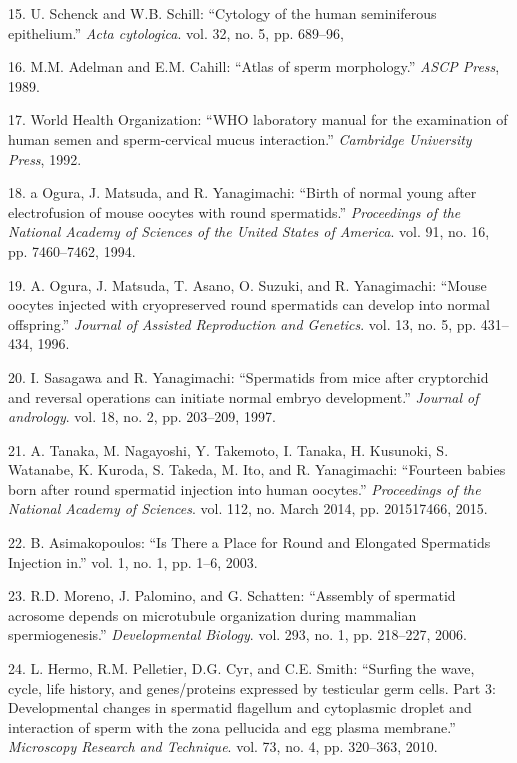 \documentclass[12pt,a4paper,twoside]{ugathesis}
\theoremstyle{definition}
\theoremstyle{definition}
\theoremstyle{definition}
\theoremstyle{remark}
\begin{document}
\hypertarget{ref-Schenck}{}
15. U. Schenck and W.B. Schill: ``Cytology of the human seminiferous
epithelium.'' \emph{Acta cytologica}. vol. 32, no. 5, pp. 689--96,

\hypertarget{ref-Adelman1989}{}
16. M.M. Adelman and E.M. Cahill: ``Atlas of sperm morphology.''
\emph{ASCP Press}, 1989.

\hypertarget{ref-WorldHealthOrganization1992}{}
17. World Health Organization: ``WHO laboratory manual for the
examination of human semen and sperm-cervical mucus interaction.''
\emph{Cambridge University Press}, 1992.

\hypertarget{ref-Ogura1994}{}
18. a Ogura, J. Matsuda, and R. Yanagimachi: ``Birth of normal young
after electrofusion of mouse oocytes with round spermatids.''
\emph{Proceedings of the National Academy of Sciences of the United
States of America}. vol. 91, no. 16, pp. 7460--7462, 1994.

\hypertarget{ref-Kimura1995}{}
19. A. Ogura, J. Matsuda, T. Asano, O. Suzuki, and R. Yanagimachi:
``Mouse oocytes injected with cryopreserved round spermatids can develop
into normal offspring.'' \emph{Journal of Assisted Reproduction and
Genetics}. vol. 13, no. 5, pp. 431--434, 1996.

\hypertarget{ref-Sasagawa}{}
20. I. Sasagawa and R. Yanagimachi: ``Spermatids from mice after
cryptorchid and reversal operations can initiate normal embryo
development.'' \emph{Journal of andrology}. vol. 18, no. 2, pp.
203--209, 1997.

\hypertarget{ref-Tanaka2015}{}
21. A. Tanaka, M. Nagayoshi, Y. Takemoto, I. Tanaka, H. Kusunoki, S.
Watanabe, K. Kuroda, S. Takeda, M. Ito, and R. Yanagimachi: ``Fourteen
babies born after round spermatid injection into human oocytes.''
\emph{Proceedings of the National Academy of Sciences}. vol. 112, no.
March 2014, pp. 201517466, 2015.

\hypertarget{ref-Asimakopoulos2003}{}
22. B. Asimakopoulos: ``Is There a Place for Round and Elongated
Spermatids Injection in.'' vol. 1, no. 1, pp. 1--6, 2003.

\hypertarget{ref-Moreno2006}{}
23. R.D. Moreno, J. Palomino, and G. Schatten: ``Assembly of spermatid
acrosome depends on microtubule organization during mammalian
spermiogenesis.'' \emph{Developmental Biology}. vol. 293, no. 1, pp.
218--227, 2006.

\hypertarget{ref-Hermo2010}{}
24. L. Hermo, R.M. Pelletier, D.G. Cyr, and C.E. Smith: ``Surfing the
wave, cycle, life history, and genes/proteins expressed by testicular
germ cells. Part 3: Developmental changes in spermatid flagellum and
cytoplasmic droplet and interaction of sperm with the zona pellucida and
egg plasma membrane.'' \emph{Microscopy Research and Technique}. vol.
73, no. 4, pp. 320--363, 2010.
\end{document}

